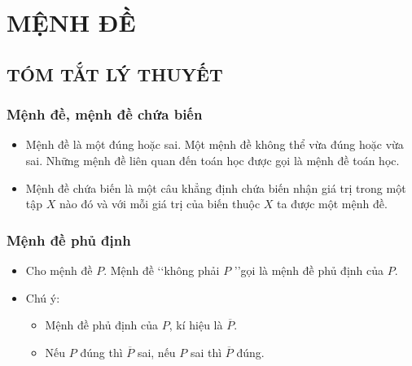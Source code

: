 \section{MỆNH ĐỀ}

\subsection{TÓM TẮT LÝ THUYẾT}
\subsubsection{Mệnh đề, mệnh đề chứa biến}
\begin{itemize}
	\item [\iconMT]  Mệnh đề là một  đúng hoặc sai. Một mệnh đề không thể vừa đúng hoặc vừa sai. Những mệnh đề liên quan đến toán học được gọi là mệnh đề toán học.
	\item [\iconMT]  Mệnh đề chứa biến là một câu khẳng định chứa biến nhận giá trị trong một tập $X$ nào đó và với mỗi giá trị của biến thuộc $X$ ta được một mệnh đề.
\end{itemize}
\subsubsection{Mệnh đề phủ định}
\begin{itemize}
	\item [\iconMT] Cho mệnh đề $P$. Mệnh đề \lq\lq không phải $P$ \rq\rq gọi là mệnh đề phủ định của $P$.
	\item [\iconMT] Chú ý: 
		\begin{note}
	\begin{itemize}
		\item  Mệnh đề phủ định của $P$, kí hiệu là $\overline{P}$.
		\item  Nếu $P$ đúng thì $\overline{P}$ sai, nếu $P$ sai thì $\overline{P}$ đúng.
	\end{itemize}
	\end{note}
\end{itemize}
